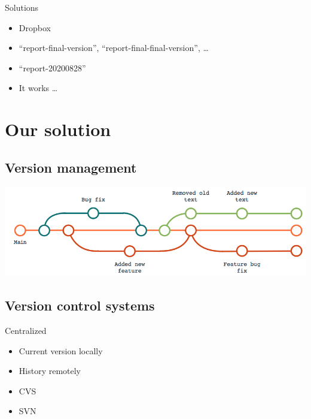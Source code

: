 \begin{frame}
  \begin{alertblock}{Solutions}
    \begin{itemize}
      \item Dropbox
      \item \enquote{report-final-version}, 
        \enquote{report-final-final-version}, \dots
      \item \enquote{report-20200828}
    \end{itemize}
  \end{alertblock}

  \pause

  \begin{remark}
    \begin{itemize}
      \item It works \dots
    \end{itemize}
  \end{remark}
\end{frame}


\section{Our solution}

\subsection{Version management}

\begin{frame}
  \centering
  \includegraphics[width=\columnwidth]{figs/version-tree.png}
\end{frame}

\subsection{Version control systems}

\begin{frame}
  \begin{block}{Centralized}
    \begin{itemize}
      \item Current version locally
      \item History remotely
    \end{itemize}
  \end{block}

  \pause

  \begin{example}
    \begin{itemize}
      \item CVS
      \item SVN
    \end{itemize}
  \end{example}
\end{frame}


